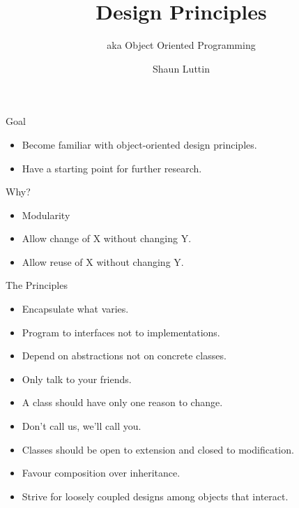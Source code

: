 \documentclass{beamer}
\title{Design Principles}
\subtitle{aka Object Oriented Programming}
\author{Shaun Luttin}
\begin{document}
\begin{frame}
  \titlepage
\end{frame}

\begin{frame}{Goal}

    \begin{itemize}
        \item Become familiar with object-oriented design principles.
        \item Have a starting point for further research.
    \end{itemize}

\end{frame}

\begin{frame}{Why?}
    \begin{itemize}
        \item Modularity
        \item Allow change of X without changing Y.
        \item Allow reuse of X without changing Y.
    \end{itemize}
\end{frame}

\begin{frame}{The Principles}
    \begin{itemize}
        \item Encapsulate what varies.
        \item Program to interfaces not to implementations.
        \item Depend on abstractions not on concrete classes. 
        \item Only talk to your friends.
        \item A class should have only one reason to change.
        \item Don't call us, we'll call you.
        \item Classes should be open to extension and closed to modification.
        \item Favour composition over inheritance.
        \item Strive for loosely coupled designs among objects that interact.
    \end{itemize}
\end{frame}
\end{document}
